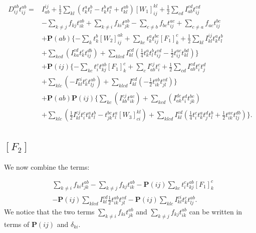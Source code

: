 \documentclass[a4paper,norsk,11pt,twoside]{report}
\begin{document}
\begin{align}
D_{ij}^{ab} t_{ij}^{ab} = & 
I_{ab}^{ij}
+ \frac{1}{2} \sum_{kl} (t_k^a t_l^b - t_k^b t_l^a + t_{kl}^{ab}) [W_1]_{ij}^{kl}
+ \frac{1}{2} \sum_{cd} I_{ab}^{cd} t_{ij}^{cd}
 \nonumber \\ &
- \sum_{k \not= j} f_{kj} t_{ik}^{ab} 
+ \sum_{k \not= i} f_{ki} t_{jk}^{ab}
- \sum_{c \not= b} f_{bc} t_{ij}^{ac}
+ \sum_{c \not= a} f_{ac} t_{ij}^{bc}
 \nonumber \\ &
+ \textbf{P}(ab) 
\{
- \sum_k t_k^b [W_2]_{ij}^{ak}
+ \sum_{kc} t_k^a t_{ij}^{bc} [F_1]_k^c
+ \frac{1}{2} \sum_{kl} I_{kl}^{ij} t_k^a t_l^b 
\nonumber \\ &
+ \sum_{kcd} 
(
I_{ka}^{cd} t_k^c t_{ij}^{db} 
)
+ \sum_{klcd} I_{kl}^{cd} 
(
\frac{1}{4} t_k^a t_l^b t_{ij}^{cd} 
- \frac{1}{2} t_{ij}^{ac} t_{kl}^{bd}
)
\}
\nonumber \\ &
+ \textbf{P}(ij)
\{
- \sum_{kc} t_i^c t_{kj}^{ab} [F_1]_k^c
+ \sum_c I_{ab}^{cj} t_i^c
+ \frac{1}{2} \sum_{cd} I_{ab}^{cd} t_i^c t_j^d 
\nonumber \\ &
+ \sum_{klc}
( 
- I_{kl}^{ci} t_k^c t_{lj}^{ab}
)
+ \sum_{klcd} I_{kl}^{cd}
(
- \frac{1}{2} t_{ik}^{ab} t_{jl}^{cd}
)
\}
\nonumber \\ &
+ \textbf{P}(ab) \textbf{P}(ij)
\{
\sum_{kc}
(
I_{kb}^{cj} t_{ik}^{ac}
)
+ \sum_{kcd}
(
I_{ak}^{dc} t_i^d t_{jk}^{bc}
)
\nonumber \\ &
+ \sum_{klc}
(
\frac{1}{2} I_{kl}^{cj} t_i^c t_k^a t_l^b
- t_{jk}^{bc} t_l^a [W_3]_{ci}^{kl}
)
+ \sum_{klcd} I_{kl}^{cd}
(
\frac{1}{4} t_i^c t_k^a t_j^d t_l^b
+ \frac{1}{2} t_{ik}^{ac} t_{lj}^{db} 
)
\} .
\end{align}

\subsection{$[F_2]$}
We now combine the terms:

\begin{align}
& \sum_{k \not= i} f_{ki} t_{jk}^{ab}
- \sum_{k \not= j} f_{kj} t_{ik}^{ab} 
- \textbf{P}(ij) \sum_{kc} t_i^c t_{kj}^{ab} [F_1]_k^c
\nonumber \\ &
- \textbf{P}(ij) \sum_{klcd} I_{kl}^{cd} \frac{1}{2} t_{ik}^{ab} t_{jl}^{cd}
- \textbf{P}(ij) \sum_{klc} I_{kl}^{ci} t_k^c t_{lj}^{ab} .
\end{align}
We notice that the two terms $\sum_{k \not= i} f_{ki} t_{jk}^{ab}$ and $\sum_{k \not= j} f_{kj} t_{ik}^{ab}$ can be written in terms of $\textbf{P}(ij)$ and $\delta_{ki}$.
\end{document}
